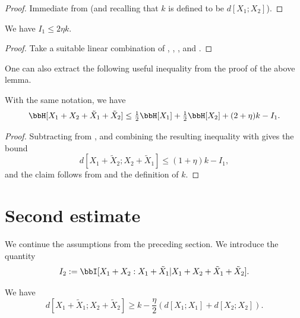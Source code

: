 \begin{proof} \leanok  Immediate from  (and recalling that $k$ is defined to be $d[X_1;X_2]$).
\end{proof}

\begin{lemma}\label{first-estimate}
  \leanok We have $I_1 \leq 2 \eta k$.
\end{lemma}

\begin{proof}\leanok  Take a suitable linear combination of , , , and .
\end{proof}

One can also extract the following useful inequality from the proof of the above lemma.

\begin{lemma}\label{foursum-bound}
  \leanok
  With the same notation, we have
  \begin{equation}
    \label{HS-bound}
    \bbH[X_1+X_2+\tilde X_1+\tilde X_2] \le \tfrac{1}{2} \bbH[X_1]+\tfrac{1}{2} \bbH[X_2] + (2 + \eta) k - I_1.
  \end{equation}
\end{lemma}

\begin{proof}\leanok
  Subtracting  from , and combining the resulting inequality with  gives the bound
\[
  d[X_1+\tilde X_2;X_2+\tilde X_1] \le (1 + \eta) k - I_1,
\]
and the claim follows from  and the definition of $k$.
\end{proof}


\section{Second estimate}

We continue the assumptions from the preceding section.
We introduce the quantity
$$ I_2 := \bbI[X_1+X_2 : X_1 + \tilde X_1 | X_1+X_2+\tilde X_1+\tilde X_2].$$

\begin{lemma}\label{dist-sums}
  \leanok
We have
$$ d[X_1+\tilde X_1; X_2+\tilde X_2] \geq k - \frac{\eta}{2} ( d[X_1; X_1] + d[X_2;X_2] ).$$
\end{lemma}

